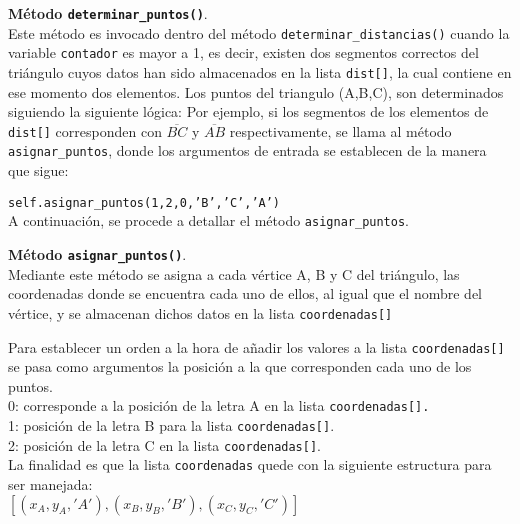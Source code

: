 \textbf{Método \texttt{determinar\_puntos()}}.\\
Este método es invocado dentro del método \texttt{determinar\_distancias()} cuando la variable \texttt{contador} es mayor a 1, es decir, existen dos segmentos correctos del triángulo cuyos datos han sido almacenados en la lista \texttt{dist[]}, la cual contiene en ese momento dos elementos.
Los puntos del triangulo (A,B,C), son determinados siguiendo la siguiente lógica:
Por ejemplo, si los segmentos de los elementos de \texttt{dist[]} corresponden con $\overline{BC}$ y $\overline{AB}$ respectivamente, se llama al método \texttt{asignar\_puntos}, donde los argumentos de entrada se establecen de la manera que sigue:

\texttt{self.asignar\_puntos(1,2,0,'B','C','A')}\\

A continuación, se procede a detallar el método \texttt{asignar\_puntos}.

\textbf{Método \texttt{asignar\_puntos()}}.\\
Mediante este método se asigna a cada vértice A, B y C del triángulo, las coordenadas donde se encuentra cada uno de ellos, al igual que el nombre del vértice, y se almacenan dichos datos en la lista \texttt{coordenadas[]}

Para establecer un orden a la hora de añadir los valores a la lista \texttt{coordenadas[]} se pasa como argumentos la posición a la que corresponden cada uno de los puntos.\\
0: corresponde a la posición de la letra A en la lista \texttt{coordenadas[].}\\
1: posición de la letra B para la lista \texttt{coordenadas[]}.\\
2: posición de la letra C en la lista \texttt{coordenadas[]}.\\

La finalidad es que la lista \texttt{coordenadas} quede con la siguiente estructura para ser 
manejada:\\

$[(x_{A},y_{A},'A'),(x_{B},y_{B},'B'),(x_{C},y_{C},'C')]$\\

